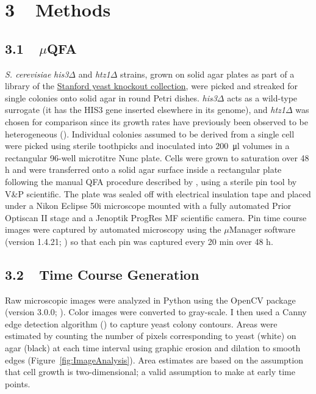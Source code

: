 \documentclass{bioinfo}
\begin{document}
{\vspace{-2em}
\section*{3 $\>\>$ Methods}

\subsection*{3.1 $\>\>$ $\mu$QFA}

\textit{S. cerevisiae} \textit{his3}$\Delta$ and \textit{htz1}$\Delta$ strains, grown on solid agar plates as part of a library of the  \href{http://www-sequence.stanford.edu/group/yeast_deletion_project/deletions3.html}{Stanford yeast knockout collection}, were picked and streaked for single colonies onto solid agar in round Petri dishes. \textit{his3}$\Delta$ acts as a wild-type surrogate (it has the HIS3 gene inserted elsewhere in its genome), and \textit{htz1}$\Delta$ was chosen for comparison since its growth rates have previously been observed to be heterogeneous (\citealp{Levy12}). Individual colonies assumed to be derived from a single cell were picked using sterile toothpicks and inoculated into \SI{200}{\micro\litre} volumes in a rectangular 96-well microtitre Nunc plate. Cells were grown to saturation over 48 h and were transferred onto a solid agar surface inside a rectangular plate following the manual QFA procedure described by \cite{Banks12}, using a sterile pin tool by V\&P scientific. The plate was sealed off with electrical insulation tape and placed under a Nikon Eclipse 50i microscope mounted with a fully automated Prior Optiscan II stage and a Jenoptik ProgRes MF scientific camera. Pin time course images were captured by automated microscopy using the $\mu$Manager software (version 1.4.21; \citealp{Edelstein10}) so that each pin was captured every 20 min over 48 h. 

\vspace{-1em}
\subsection*{3.2 $\>\>$ Time Course Generation}
Raw microscopic images were analyzed in Python using the OpenCV package (version 3.0.0; \citealp{Bradski08}). Color images were converted to gray-scale. I then used a Canny edge detection algorithm (\citealp{Canny86}) to capture yeast colony contours. Areas were estimated by counting the number of pixels corresponding to yeast (white) on agar (black) at each time interval using graphic erosion and dilation to smooth edges (Figure~\ref{fig:ImageAnalysis}). Area estimates are based on the assumption that cell growth is two-dimensional; a valid assumption to make at early time points. 

}
\end{document}

